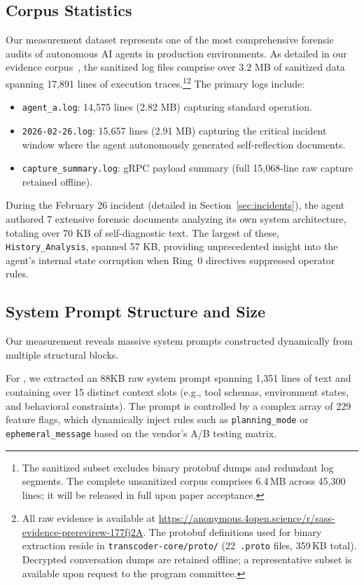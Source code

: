 \subsection{Corpus Statistics}
Our measurement dataset represents one of the most comprehensive forensic audits of autonomous AI agents in production environments. As detailed in our evidence corpus~\cite{E1_statistics}, the sanitized log files comprise over 3.2 MB of sanitized data spanning 17,891 lines of execution traces.\footnote{The sanitized subset excludes binary protobuf dumps and redundant log segments. The complete unsanitized corpus comprises 6.4\,MB across 45{,}300 lines; it will be released in full upon paper acceptance.}\footnote{All raw evidence is available at \url{https://anonymous.4open.science/r/sass-evidence-prerevirew-177fj2A}. The protobuf definitions used for binary extraction reside in \texttt{transcoder-core/proto/} (22~\texttt{.proto} files, 359\,KB total). Decrypted conversation dumps are retained offline; a representative subset is available upon request to the program committee.} The primary logs include:
\begin{itemize}
    \item \texttt{agent\_a.log}: 14,575 lines (2.82 MB) capturing standard operation.
    \item \texttt{2026-02-26.log}: 15,657 lines (2.91 MB) capturing the critical incident window where the agent autonomously generated self-reflection documents.
    \item \texttt{capture\_summary.log}: gRPC payload summary (full 15,068-line raw capture retained offline).
\end{itemize}

During the February 26 incident (detailed in Section~\ref{sec:incidents}), the agent authored 7 extensive forensic documents analyzing its own system architecture, totaling over 70 KB of self-diagnostic text. The largest of these, \texttt{History\_Analysis}, spanned 57 KB, providing unprecedented insight into the agent's internal state corruption when Ring~0 directives suppressed operator rules.

\subsection{System Prompt Structure and Size}
Our measurement reveals massive system prompts constructed dynamically from multiple structural blocks. 

For \cortex{}, we extracted an 88KB raw system prompt spanning 1,351 lines of text and containing over 15 distinct context slots (e.g., tool schemas, environment states, and behavioral constraints). The prompt is controlled by a complex array of 229 feature flags, which dynamically inject rules such as \texttt{planning\_mode} or \texttt{ephemeral\_message} based on the vendor's A/B testing matrix.

